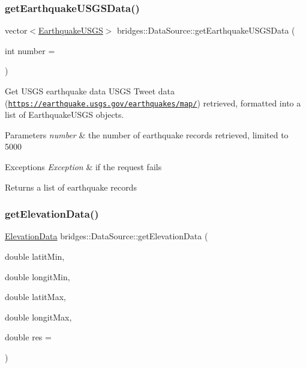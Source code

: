 \subsubsection{\texorpdfstring{get\+Earthquake\+U\+S\+G\+S\+Data()}{getEarthquakeUSGSData()}}
{\footnotesize\ttfamily vector$<$\hyperlink{classbridges_1_1dataset_1_1_earthquake_u_s_g_s}{Earthquake\+U\+S\+GS}$>$ bridges\+::\+Data\+Source\+::get\+Earthquake\+U\+S\+G\+S\+Data (\begin{DoxyParamCaption}\item[{int}]{number = {} }\end{DoxyParamCaption})\hspace{0.3cm}{\ttfamily [inline]}}



Get U\+S\+GS earthquake data U\+S\+GS Tweet data (\href{https://earthquake.usgs.gov/earthquakes/map/}{\tt https\+://earthquake.\+usgs.\+gov/earthquakes/map/}) retrieved, formatted into a list of Earthquake\+U\+S\+GS objects. 


\begin{DoxyParams}{Parameters}
{\em number} & the number of earthquake records retrieved, limited to 5000 \\
\hline
\end{DoxyParams}

\begin{DoxyExceptions}{Exceptions}
{\em Exception} & if the request fails\\
\hline
\end{DoxyExceptions}
\begin{DoxyReturn}{Returns}
a list of earthquake records 
\end{DoxyReturn}
\mbox{\label{classbridges_1_1_data_source_a7fc5797c544d79f245ac49af1cc138a3}} 
\subsubsection{\texorpdfstring{get\+Elevation\+Data()}{getElevationData()}}
{\footnotesize\ttfamily \hyperlink{classbridges_1_1dataset_1_1_elevation_data}{Elevation\+Data} bridges\+::\+Data\+Source\+::get\+Elevation\+Data (\begin{DoxyParamCaption}\item[{double}]{latit\+Min,  }\item[{double}]{longit\+Min,  }\item[{double}]{latit\+Max,  }\item[{double}]{longit\+Max,  }\item[{double}]{res = {} }\end{DoxyParamCaption})\hspace{0.3cm}{\ttfamily [inline]}}

